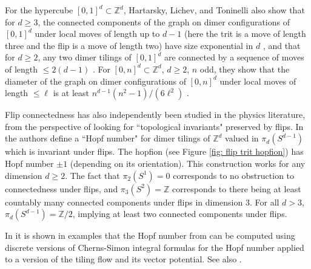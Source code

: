 \documentclass[11pt]{article}
\theoremstyle{remark}
\theoremstyle{definition}
\newcommand{\m}[1]{\mathbb{#1}}
\begin{document}
For the hypercube $[0,1]^d\subset \m Z^d$, Hartarsky, Lichev, and Toninelli also show that for $d\geq 3$, the connected components of the graph on dimer configurations of $[0,1]^d$ under local moves of length up to $d-1$ (here the trit is a move of length three and the flip is a move of length two) have size exponential in $d$ \cite[Theorem 5]{localdimer}, and that for $d\geq 2$, any two dimer tilings of $[0,1]^d$ are connected by a sequence of moves of length $\leq 2(d-1)$ \cite[Theorem 6]{localdimer}. For $[0,n]^d\subset \m Z^d$, $d\geq 2$, $n$ odd, they show that the diameter of the graph on dimer configurations of $[0,n]^d$ under local moves of length $\leq \ell$ is at least $n^{d-1}(n^2-1)/(6\ell^2)$ \cite[Theorem 7]{localdimer}.

Flip connectedness has also independently been studied in the physics literature, from the perspective of looking for ``topological invariants" preserved by flips. In \cite{freedman2011weakly} the authors define a ``Hopf number" for dimer tilings of $\m Z^d$ valued in $\pi_d(S^{d-1})$ which is invariant under flips. The hopfion (see Figure \ref{fig: flip trit hopfion}) has Hopf number $\pm 1$ (depending on its orientation). This construction works for any dimension $d\geq 2$. The fact that $\pi_2(S^1) = 0$ corresponds to no obstruction to connectedness under flips, and $\pi_3(S^2) = \m Z$ corresponds to there being at least countably many connected components under flips in dimension $3$. For all $d>3$, $\pi_d(S^{d-1}) = \m Z/2$, implying at least two connected components under flips. 

In \cite{bednik2019hopfions} it is shown in examples that the Hopf number from \cite{freedman2011weakly} can be computed using discrete versions of Cherns-Simon integral formulas for the Hopf number applied to a version of the tiling flow and its vector potential. See also \cite{bednik2019probing}.
\end{document}

